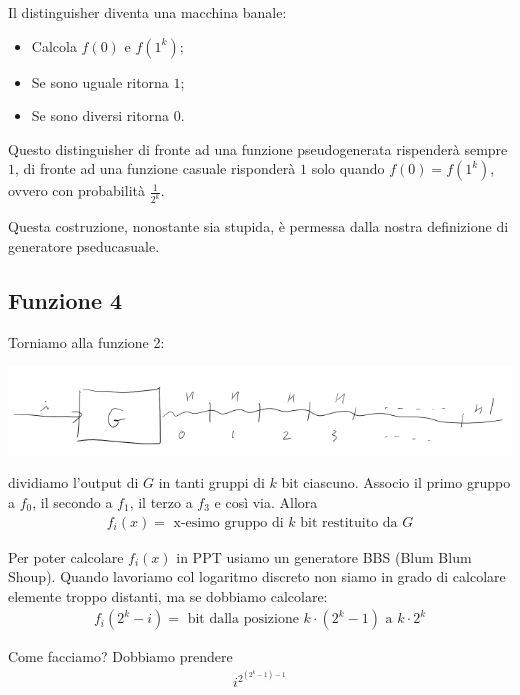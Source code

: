 \begin{enumerate}
    Il distinguisher diventa una macchina banale:
    \begin{itemize}
        \item Calcola $f(0)$ e $f(1^k)$;
        \item Se sono uguale ritorna $1$;
        \item Se sono diversi ritorna $0$.
    \end{itemize}
    Questo distinguisher di fronte ad una funzione pseudogenerata rispenderà sempre $1$, di fronte ad una funzione casuale risponderà $1$ solo quando $f(0) = f(1^k)$, ovvero con probabilità $\frac{1}{2^k}$.

    Questa costruzione, nonostante sia stupida, è permessa dalla nostra definizione di generatore pseducasuale.
\end{enumerate}

\subsection{Funzione 4}

Torniamo alla funzione 2:
\begin{center}
    \includegraphics[width=1\textwidth]{images/fun2.png}
\end{center}

\noindent dividiamo l'output di $G$ in tanti gruppi di $k$ bit ciascuno. Associo il primo gruppo a $f_0$, il secondo a $f_1$, il terzo a $f_3$ e così via. Allora 
\begin{align*}
    f_i(x) = \text{ x-esimo gruppo di $k$ bit restituito da $G$}
\end{align*}

\noindent Per poter calcolare $f_i(x)$ in PPT usiamo un generatore BBS (Blum Blum Shoup). Quando lavoriamo col logaritmo discreto non siamo in grado di calcolare elemente troppo distanti, ma se dobbiamo calcolare:
\begin{align*}
    f_i(2^k - i) = \text{ bit dalla posizione $k\cdot (2^k-1)$ a $k \cdot 2^k$}
\end{align*}

\noindent Come facciamo? Dobbiamo prendere
\begin{align*}
    i^{2^{(2^k-1)-1}}
\end{align*}

